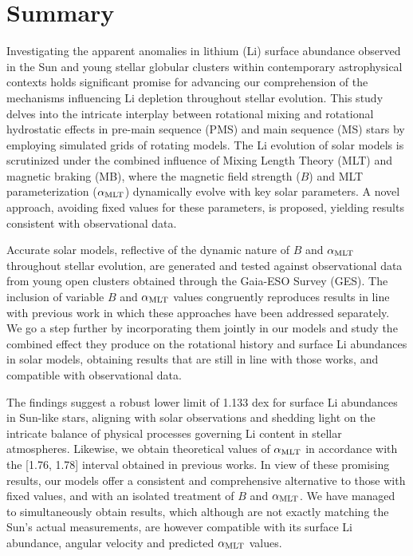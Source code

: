 %

\chapter{Summary}

Investigating the apparent anomalies in lithium (Li) surface abundance observed in the Sun and young stellar globular clusters within contemporary astrophysical contexts holds significant promise for advancing our comprehension of the mechanisms influencing Li depletion throughout stellar evolution. This study delves into the intricate interplay between rotational mixing and rotational hydrostatic effects in pre-main sequence (PMS) and main sequence (MS) stars by employing simulated grids of rotating models. The Li evolution of solar models is scrutinized under the combined influence of Mixing Length Theory (MLT) and magnetic braking (MB), where the magnetic field strength ($B$) and MLT parameterization ($\alpha_{\mathrm{MLT}}$) dynamically evolve with key solar parameters. A novel approach, avoiding fixed values for these parameters, is proposed, yielding results consistent with observational data.\par

Accurate solar models, reflective of the dynamic nature of $B$ and $\alpha_{\mathrm{MLT}}$ throughout stellar evolution, are generated and tested against observational data from young open clusters obtained through the Gaia-ESO Survey (GES). The inclusion of variable $B$ and $\alpha_{\mathrm{MLT}}$ values congruently reproduces results in line with previous work in which these approaches have been addressed separately. We go a step further by incorporating them jointly in our models and study the combined effect they produce on the rotational history and surface Li abundances in solar models, obtaining results that are still in line with those works, and compatible with observational data.\par

The findings suggest a robust lower limit of 1.133 dex for surface Li abundances in Sun-like stars, aligning with solar observations and shedding light on the intricate balance of physical processes governing Li content in stellar atmospheres. Likewise, we obtain theoretical values of $\alpha_{\mathrm{MLT}}$ in accordance with the [1.76, 1.78] interval  obtained in previous works. In view of these promising results, our models offer a consistent and comprehensive alternative to those with fixed values, and with an isolated treatment of $B$ and $\alpha_{\mathrm{MLT}}$. We have managed to simultaneously obtain results, which although are not exactly matching the Sun's actual measurements, are however compatible with its surface Li abundance, angular velocity and predicted $\alpha_{\mathrm{MLT}}$ values.\par


\endinput
